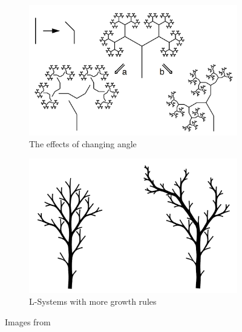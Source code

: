 \documentclass[12pt,twoside]{reedthesis}
\begin{document}
	
	\begin{figure}[h]
	\centering
	\begin{subfigure}{0.5\linewidth}
		\centering
		\includegraphics[width=\linewidth]{Images/Prusinkiewicz1}
		\caption{The effects of changing angle}
		\label {AngleChange}
	\end{subfigure}%
	\hfill
	\begin{subfigure}{0.5\linewidth}
		\centering
		\includegraphics[width=\linewidth]{Images/Prusinkiewicz2}
		\caption{L-Systems with more growth rules}
		\label {MesotonicAcrotonic}
	\end{subfigure}
	\caption{Images from \cite{LSystems2001}}
	\label{LeopoldTrees}
	\end{figure}
	
\end{document}
